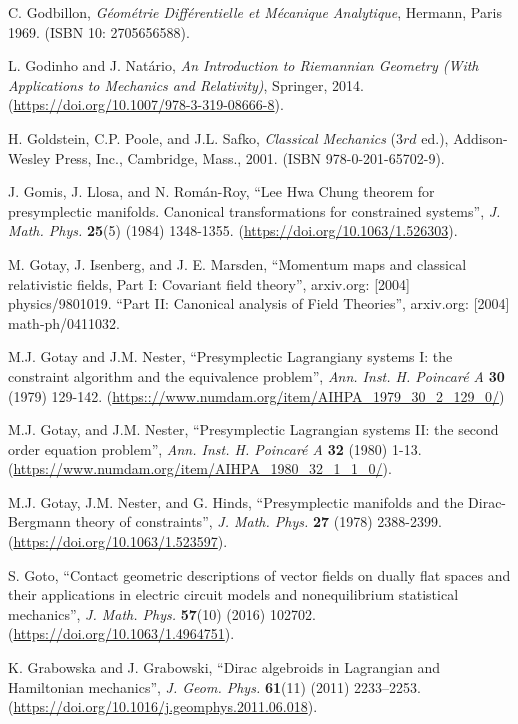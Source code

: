 \documentclass[12pt]{report}
\begin{document}
\begin{thebibliography}{999}
C. Godbillon,
{\it G\'eom\'etrie Diff\'erentielle et M\'ecanique Analytique},
Hermann, Paris 1969.
(ISBN 10: 2705656588).

L. Godinho and J. Nat\'ario,
{\it An Introduction to Riemannian Geometry
(With Applications to Mechanics and Relativity)},
Springer, 2014.
(\url{https://doi.org/10.1007/978-3-319-08666-8}).

H. Goldstein, C.P. Poole, and J.L. Safko,
{\it Classical Mechanics} ($3rd$ ed.),
Addison-Wesley Press, Inc., Cambridge, Mass., 2001.
(ISBN 978-0-201-65702-9).

J. Gomis, J. Llosa, and N. Rom\'an-Roy,
``Lee Hwa Chung theorem for presymplectic manifolds.
  Canonical transformations for constrained systems'',
{\sl J. Math. Phys.} {\bf 25}(5) (1984) 1348-1355.
(\url{https://doi.org/10.1063/1.526303}).

M. Gotay, J. Isenberg, and J. E. Marsden,
 ``Momentum maps and classical relativistic fields, Part I: Covariant field theory'',
arxiv.org: [2004] physics/9801019. ``Part II: Canonical analysis
of Field Theories'', arxiv.org: [2004] math-ph/0411032.

M.J. Gotay and J.M. Nester,
``Presymplectic Lagrangiany systems I: the constraint algorithm and the
equivalence problem'',
{\sl Ann. Inst. H. Poincar\'e A} {\bf 30} (1979) 129-142.
(\url{https:://www.numdam.org/item/AIHPA_1979_30_2_129_0/})

M.J. Gotay, and J.M. Nester, ``Presymplectic Lagrangian systems II: the second order equation problem'', 
{\sl Ann. Inst. H. Poincar\'e A} {\bf 32} (1980) 1-13.
(\url{https://www.numdam.org/item/AIHPA_1980_32_1_1_0/}).

M.J. Gotay, J.M. Nester, and G. Hinds,
``Presymplectic manifolds and the Dirac-Bergmann theory of constraints'',
{\sl J. Math. Phys.} {\bf 27} (1978) 2388-2399.
(\url{https://doi.org/10.1063/1.523597}).

S. Goto,
``Contact geometric descriptions of vector fields on dually flat spaces
  and their applications in electric circuit models and nonequilibrium
  statistical mechanics'',
{\sl J. Math. Phys.} {\bf 57}(10) (2016) 102702.
(\url{https://doi.org/10.1063/1.4964751}).

K. Grabowska and J. Grabowski,
``Dirac algebroids in Lagrangian and Hamiltonian mechanics'',
{\sl J. Geom. Phys.}
{\bf 61}(11) (2011) 2233--2253.
(\url{https://doi.org/10.1016/j.geomphys.2011.06.018}).


\end{thebibliography}
\end{document}
